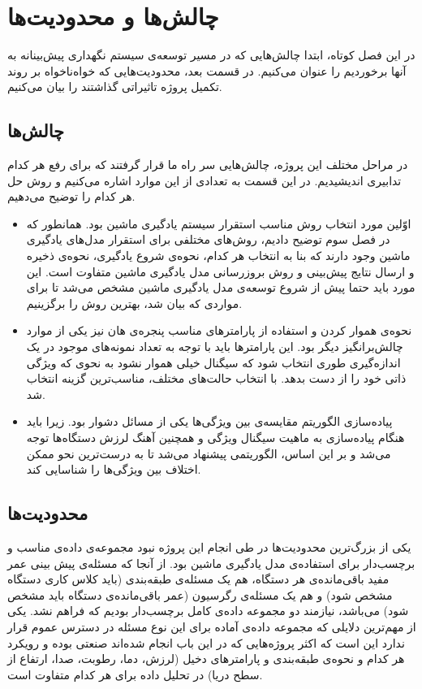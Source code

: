 \chapter{چالش‌ها و محدودیت‌ها}
در این فصل کوتاه، ابتدا چالش‌هایی که در مسیر توسعه‌ی سیستم نگهداری پیش‌بینانه به آنها برخوردیم را عنوان می‌کنیم. در قسمت بعد، محدودیت‌هایی که خواه‌‌نا‌خواه بر روند تکمیل پروژه تاثیراتی گذاشتند را بیان می‌کنیم.

\section{چالش‌ها}
در مراحل مختلف این پروژه، چالش‌هایی سر راه ما قرار گرفتند که برای رفع هر کدام تدابیری اندیشیدیم. در این قسمت به تعدادی از این موارد اشاره می‌کنیم و روش حل هر کدام را توضیح می‌دهیم. 

\begin{itemize}

\item اوّلین مورد انتخاب روش مناسب استقرار سیستم یادگیری ماشین بود. همانطور که در فصل سوم توضیح دادیم، روش‌های مختلفی برای استقرار مدل‌های یادگیری ماشین وجود دارند که بنا به انتخاب هر کدام، نحوه‌ی شروع یادگیری، نحوه‌ی ذخیره‌ و ارسال نتایج پیش‌بینی و روش بروزرسانی مدل یادگیری ماشین متفاوت است. این مورد باید حتما پیش از شروع توسعه‌ی مدل یادگیری ماشین مشخص می‌شد تا برای مواردی که بیان شد، بهترین روش را برگزینیم.

\item نحوه‌ی هموار کردن و استفاده از پارامترهای مناسب پنجره‌ی هان نیز یکی از موارد چالش‌برانگیز دیگر بود. این پارامترها باید با توجه به تعداد نمونه‌های موجود در یک اندازه‌گیری طوری  انتخاب شود که سیگنال خیلی هموار نشود به نحوی که ویژگی ذاتی خود را از دست بدهد. با انتخاب حالت‌های مختلف، مناسب‌ترین گزینه انتخاب شد.

\item پیاده‌سازی الگوریتم مقایسه‌ی بین ویژگی‌ها یکی از مسائل دشوار بود. زیرا باید هنگام پیاده‌سازی به ماهیت سیگنال ویژگی  و همچنین آهنگ لرزش دستگا‌ه‌ها توجه می‌شد و بر این اساس، الگوریتمی پیشنهاد می‌شد تا به درست‌ترین نحو ممکن اختلاف بین ویژگی‌ها را شناسایی کند. 

\end{itemize}


\section{محدودیت‌ها}
یکی از بزرگ‌ترین محدودیت‌ها در طی انجام این پروژه نبود مجموعه‌ی داده‌‌ی مناسب و برچسب‌دار برای استفاده‌ی مدل یادگیری ماشین بود. از آنجا که مسئله‌ی پیش بینی عمر مفید باقی‌مانده‌ی هر دستگاه، هم یک مسئله‌ی طبقه‌بندی (باید کلاس کاری دستگاه مشخص شود) و هم یک مسئله‌ی رگرسیون (عمر باقی‌مانده‌ی دستگاه باید مشخص شود) می‌باشد، نیازمند دو مجموعه داده‌ی کامل برچسب‌دار بودیم که فراهم نشد. یکی از مهم‌ترین دلایلی که مجموعه داده‌ی آماده برای این نوع مسئله در دسترس عموم قرار ندارد این است که اکثر پروژه‌هایی که در این باب انجام شده‌اند صنعتی بوده و رویکرد هر کدام و نحوه‌ی طبقه‌بندی و پارامترهای دخیل (لرزش، دما، رطوبت، صدا، ارتفاع از سطح دریا) در تحلیل داده برای هر کدام متفاوت است.